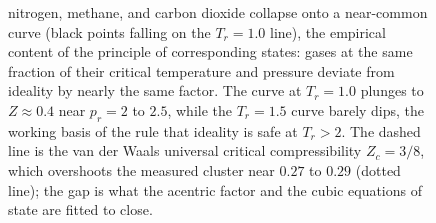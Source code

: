 \begin{figure}[htbp]
{nitrogen, methane, and carbon dioxide collapse onto a near-common curve
(black points falling on the $T_r = 1.0$ line), the empirical content of
the principle of corresponding states: gases at the same fraction of
their critical temperature and pressure deviate from ideality by nearly
the same factor. The curve at $T_r = 1.0$ plunges to $Z \approx 0.4$ near
$p_r = 2$ to $2.5$, while the $T_r = 1.5$ curve barely dips, the working
basis of the rule that ideality is safe at $T_r > 2$. The dashed line is
the van der Waals universal critical compressibility $Z_c = 3/8$, which
overshoots the measured cluster near $0.27$ to $0.29$ (dotted line); the
gap is what the acentric factor and the cubic equations of state are
fitted to close.}
\label{fig:vol04ch02:zchart-corresponding-states}
\end{figure}
